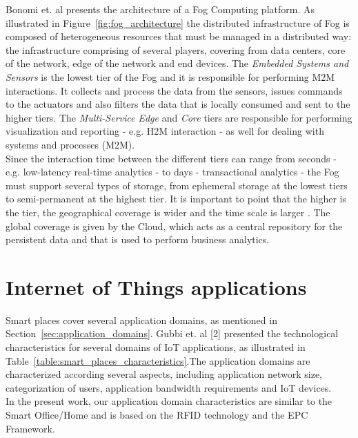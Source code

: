 Bonomi et. al \cite{bonomi2012fog} presents the architecture of a Fog Computing platform. As illustrated
in Figure~\ref{fig:fog_architecture} the distributed infrastructure of Fog is composed of heterogeneous
resources that must be managed in a distributed way: the infrastructure comprising of several players,
covering from data centers, core of the network, edge of the network and end devices. The \textit{Embedded Systems and Sensors}
is the lowest tier of the Fog and it is responsible for performing \gls{M2M} interactions. It collects and
process the data from the sensors, issues commands to the actuators and also filters the data that
is locally consumed and sent to the higher tiers. The \textit{Multi-Service Edge} and \textit{Core}
tiers are responsible for performing visualization and reporting - e.g. \gls{H2M} interaction -
as well for dealing with systems and processes (\gls{M2M}).\\

Since the interaction time between the different tiers can range from seconds - e.g. low-latency real-time
analytics - to days - transactional analytics - the Fog must support several types of storage, from
ephemeral storage at the lowest tiers to semi-permanent at the highest tier. It is important to point
that the higher is the tier, the geographical coverage is wider and the time scale is larger \cite{bonomi2014fog}.
The global coverage is given by the Cloud, which acts as a central repository for the persistent data
and that is used to perform business analytics.

\section{Internet of Things applications}
\label{sec:iot_domains}
Smart places cover several application domains, as mentioned in Section~\ref{sec:application_domains}.
Gubbi et. al [2] presented the technological characteristics for several domains of IoT applications,
as illustrated in Table~\ref{table:smart_places_characteristics}.The application domains are characterized
according several aspects, including application network size, categorization of users, application
bandwidth requirements and \gls{IoT} devices.\\

In the present work, our application domain characteristics are similar to the Smart Office/Home and
is based on the \gls{RFID} technology and the \gls{EPC} Framework.

